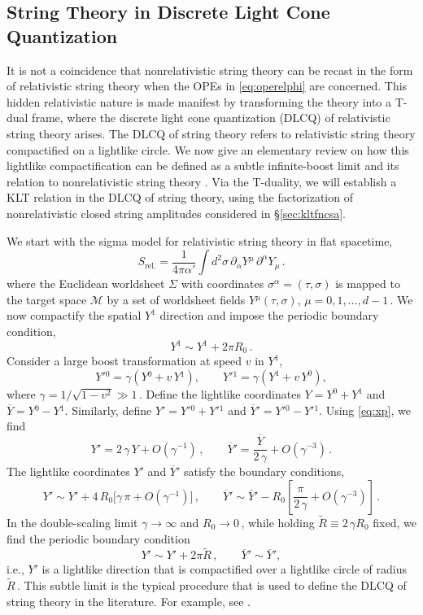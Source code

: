 \documentclass[11pt]{article}
\newcommand{\be}{\begin{equation}}
\newcommand{\ee}{\end{equation}}
\newcommand{\CM}{\mathcal{M}}
\newcommand{\p}{\partial}
\renewcommand{\tilde}[1]{\widetilde{#1}}
\begin{document}
\subsection{String Theory in Discrete Light Cone Quantization} \label{sec:stdlcq}

It is not a coincidence that nonrelativistic string theory can be recast in the form of relativistic string theory when the OPEs in \eqref{eq:operelphi} are concerned. This hidden relativistic nature is made manifest by transforming the theory into a T-dual frame, where the discrete light cone quantization (DLCQ) of relativistic string theory arises. The DLCQ of string theory refers to relativistic string theory compactified on a lightlike circle. We now give an elementary review on how this lightlike compactification can be defined as a subtle infinite-boost limit \cite{Seiberg:1997ad} and its relation to nonrelativistic string theory \cite{Bergshoeff:2018yvt}. Via the T-duality, we will establish a KLT relation in the DLCQ of string theory, using the factorization of nonrelativistic closed string amplitudes considered in \S\ref{sec:kltfncsa}.

We start with the sigma model for relativistic string theory in flat spacetime,
%
\be \label{eq:srel}
    S_\text{rel.} = \frac{1}{4\pi\alpha'} \int d^2\sigma \, \p_\alpha Y{}^\mu \, \p^\alpha Y_\mu\,.
\ee
%
where the Euclidean worldsheet $\Sigma$ with coordinates $\sigma^\alpha = (\tau, \sigma)$ is mapped to the target space $\CM$ by a set of worldsheet fields $Y{}^\mu (\tau, \sigma)$, $\mu = 0, 1, \dots, d-1$\,.
We now compactify the spatial $
Y^1$ direction and impose the periodic boundary condition,
%
\be \label{eq:y1pbc}
    Y^1 \sim Y^1 + 2 \pi R_0\,.
\ee
%
Consider a large boost transformation at speed $v$ in $Y^1$,
%
\be \label{eq:xp}
    Y{}'{}^0 = \gamma \left( Y{}^0 + v \, Y{}^1 \right),
        \qquad
    Y{}'{}^1 = \gamma \left( Y^1 + v \, Y^0 \right),
\ee
%
where $\gamma = 1/ \sqrt{1 - v^2} \gg 1$\,. Define the lightlike coordinates 
$Y = Y^0 + Y^1$ and
$\overline{Y} = Y{}^0 - Y{}^1$.
%
Similarly, define $Y{}' = Y{}'{}^0 + Y{}'{}^1$ and $\overline{Y}{}' = {Y'}{}^0 - {Y'}{}^1$. Using \eqref{eq:xp}, we find
%
\be
    Y' = 2 \, \gamma \, Y + O(\gamma^{-1})\,,
        \qquad
    \overline{Y}{}' = \frac{\overline{Y}}{2 \, \gamma} + O(\gamma^{-3})\,.
\ee
%
The lightlike coordinates $Y'$ and $
\overline{Y}{}'$ satisfy the boundary conditions,
%
\be
    {Y'} \sim Y' + 4 \, R_0 \bigl[ \gamma \, \pi + O (\gamma^{-1}) \bigr]\,,
        \qquad%
    \overline{Y}{}' \sim \overline{Y}{}' - R_0 \left[ \frac{\pi}{2 \, \gamma} + O(\gamma^{-3}) \right]\,.
\ee
%
In the double-scaling limit $\gamma \rightarrow \infty$ and $R_0 \rightarrow 0$\,, while holding $\tilde{R} \equiv 2 \, \gamma R_0$ fixed, we find the periodic boundary condition
%
\be \label{eq:yp}
    Y' \sim Y' + 2 \pi \tilde{R}\,,
        \qquad
    \overline{Y}{}' \sim \overline{Y}{}',
\ee
%
i.e., $Y'$ is a lightlike direction that is compactified over a lightlike circle of radius $\tilde{R}$\,. This subtle limit is the typical procedure that is used to define the DLCQ of string theory in the literature. For example, see \cite{Seiberg:1997ad}.
\end{document}
